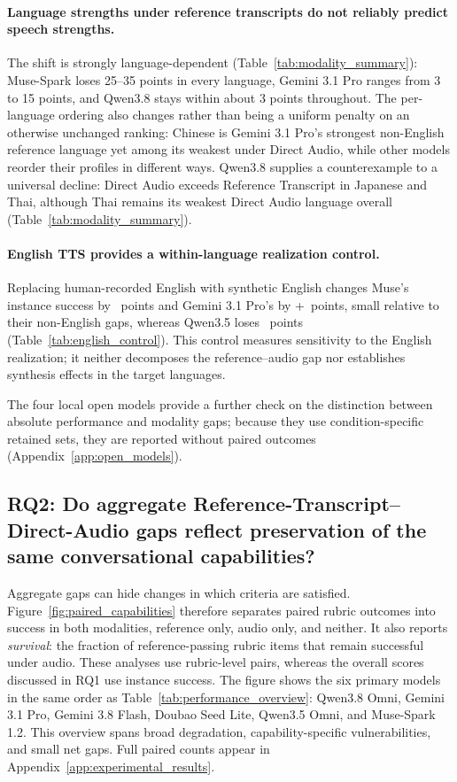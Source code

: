 \documentclass{article}
\begin{document}
\paragraph{Language strengths under reference transcripts do not reliably predict speech strengths.}
The shift is strongly language-dependent (Table~\ref{tab:modality_summary}): Muse-Spark loses 25--35 points in every language, Gemini 3.1 Pro ranges from 3 to 15 points, and Qwen3.8 stays within about 3 points throughout. The per-language ordering also changes rather than being a uniform penalty on an otherwise unchanged ranking: Chinese is Gemini 3.1 Pro's strongest non-English reference language yet among its weakest under Direct Audio, while other models reorder their profiles in different ways. Qwen3.8 supplies a counterexample to a universal decline: Direct Audio exceeds Reference Transcript in Japanese and Thai, although Thai remains its weakest Direct Audio language overall (Table~\ref{tab:modality_summary}).


\paragraph{English TTS provides a within-language realization control.}
Replacing human-recorded English with synthetic English changes Muse's instance success by \resMuseEnglishTTSDelta\ points and Gemini 3.1 Pro's by +\resGProEnglishTTSDelta\ points, small relative to their non-English gaps, whereas Qwen3.5 loses \resQOldEnglishTTSDeltaAbs\ points (Table~\ref{tab:english_control}). This control measures sensitivity to the English realization; it neither decomposes the reference--audio gap nor establishes synthesis effects in the target languages.

The four local open models provide a further check on the distinction between absolute performance and modality gaps; because they use condition-specific retained sets, they are reported without paired outcomes (Appendix~\ref{app:open_models}).

\subsection{RQ2: Do aggregate Reference-Transcript--Direct-Audio gaps reflect preservation of the same conversational capabilities?}
\label{sec:capability_results}

Aggregate gaps can hide changes in which criteria are satisfied. Figure~\ref{fig:paired_capabilities} therefore separates paired rubric outcomes into success in both modalities, reference only, audio only, and neither. It also reports \textit{survival}: the fraction of reference-passing rubric items that remain successful under audio. These analyses use rubric-level pairs, whereas the overall scores discussed in RQ1 use instance success. The figure shows the six primary models in the same order as Table~\ref{tab:performance_overview}: Qwen3.8 Omni, Gemini 3.1 Pro, Gemini 3.8 Flash, Doubao Seed Lite, Qwen3.5 Omni, and Muse-Spark 1.2. This overview spans broad degradation, capability-specific vulnerabilities, and small net gaps. Full paired counts appear in Appendix~\ref{app:experimental_results}.
\end{document}
